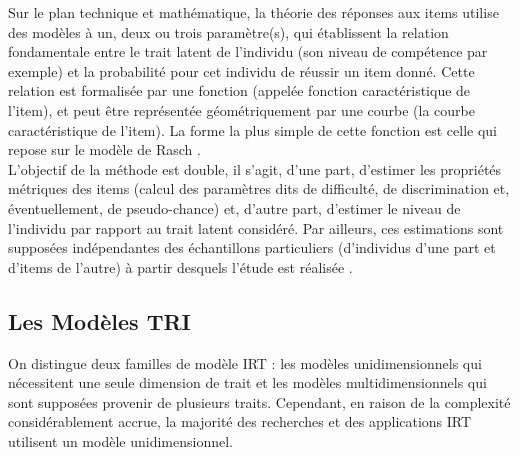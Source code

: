 Sur le plan technique et mathématique, la théorie des réponses aux items utilise des modèles à un, deux ou trois paramètre(s), qui établissent la relation fondamentale entre le trait latent de l'individu (son niveau de compétence par exemple) et la probabilité pour cet individu de réussir un item donné. Cette relation est formalisée par une fonction (appelée fonction caractéristique de l'item), et peut être représentée géométriquement par une courbe (la courbe caractéristique de l'item). La forme la plus simple de cette fonction est celle qui repose sur le modèle de Rasch \cite{xcv_wiki}.\\
L'objectif de la méthode est double, il s'agit, d'une part, d'estimer les propriétés métriques des items (calcul des paramètres dits de difficulté, de discrimination et, éventuellement, de pseudo-chance) et, d'autre part, d'estimer le niveau de l'individu par rapport au trait latent considéré. Par ailleurs, ces estimations sont supposées indépendantes des échantillons particuliers (d'individus d'une part et d'items de l'autre) à partir desquels l'étude est réalisée \cite{xcv_wiki}.

\subsection{Les Modèles TRI}
On distingue deux familles de modèle IRT : les modèles unidimensionnels qui nécessitent une seule dimension de trait et les modèles multidimensionnels qui sont supposées provenir de plusieurs traits. Cependant, en raison de la complexité considérablement accrue, la majorité des recherches et des applications IRT utilisent un modèle unidimensionnel.
